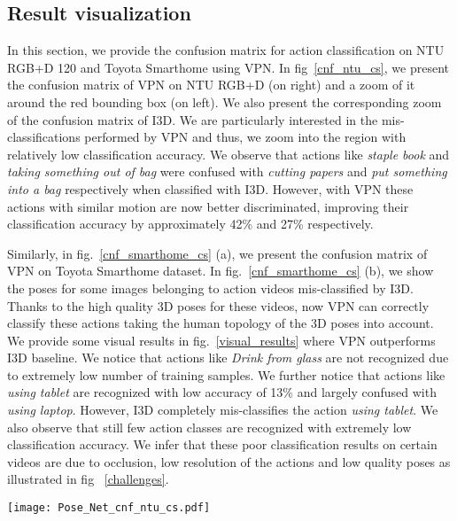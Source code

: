 \documentclass[runningheads]{llncs}
\begin{document}
\subsection{Result visualization}
In this section, we provide the confusion matrix for action classification on NTU RGB+D 120 and Toyota Smarthome using VPN.  
In fig~\ref{cnf_ntu_cs}, we present the confusion matrix of VPN on NTU RGB+D (on right) and a zoom of it around the red bounding box (on left). We also present the corresponding zoom of the confusion matrix of I3D. We are particularly interested in the mis-classifications performed by VPN and thus, we zoom into the region with relatively low classification accuracy. We observe that actions like \textit{staple book} and \textit{taking something out of bag} were confused with \textit{cutting papers} and \textit{put something into  a bag} respectively when classified with I3D. However, with VPN these actions with similar motion are now better discriminated, improving their classification accuracy by approximately  42\% and 27\% respectively. 

Similarly, in fig.~\ref{cnf_smarthome_cs} (a), we present the confusion matrix of VPN on Toyota Smarthome dataset. In fig.~\ref{cnf_smarthome_cs} (b), we show the poses for some images belonging to action videos mis-classified by I3D. Thanks to the high quality 3D poses for these videos, now VPN can correctly classify these actions taking the human topology of the 3D poses into account. We provide some visual results in fig.~\ref{visual_results} where VPN outperforms I3D baseline.
We notice that actions like \textit{Drink from glass} are not recognized due to extremely low number of training samples. We further notice that actions like \textit{using tablet} are recognized with low accuracy of 13\% and largely confused with \textit{using laptop}. However, I3D completely mis-classifies the action \textit{using tablet}. We also observe that still few action classes are recognized with extremely low classification accuracy. We infer that these poor classification results on certain videos are due to occlusion, low resolution of the actions and low quality poses as illustrated in fig ~\ref{challenges}. 

\begin{figure*}
\centering
\texttt{[image: Pose\_Net\_cnf\_ntu\_cs.pdf]}
\caption{Confusion matrix of VPN on NTU RGB+D (CS Protocol) on the right. Zoom of the red bounding box on the left along with the corresponding confusion matrix of I3D. }
\label{cnf_ntu_cs}
\end{figure*}
\end{document}
